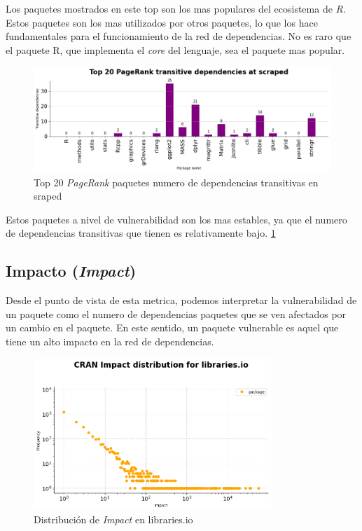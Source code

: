 Los paquetes mostrados en este top son los mas populares del ecosistema de \textit{R}.
Estos paquetes son los mas utilizados por otros paquetes, lo que los hace fundamentales para el
funcionamiento de la red de dependencias. No es raro que el paquete R, que implementa el \textit{core}
del lenguaje, sea el paquete mas popular.

\begin{figure}[h!]
    \begin{center}
        \includegraphics[width=1\textwidth]{img/cran/transitive_pr_scr.png}
        \caption{Top 20 \textit{PageRank} paquetes numero de dependencias transitivas en sraped}
        \label{fig:Top 20 PageRank paquetes numero de dependencias transitivas en sraped}
    \end{center}
\end{figure}

Estos paquetes a nivel de vulnerabilidad son los mas estables, ya que el numero de dependencias
transitivas que tienen es relativamente bajo. \ref{fig:Top 20 PageRank paquetes numero de dependencias transitivas en sraped}

\subsection{Impacto (\textit{Impact})}

Desde el punto de vista de esta metrica, podemos interpretar la vulnerabilidad de un paquete como el numero
de dependencias paquetes que se ven afectados por un cambio en el paquete. En este sentido, un paquete
vulnerable es aquel que tiene un alto impacto en la red de dependencias.

\begin{figure}[h!]
    \begin{center}
        \includegraphics[width=0.8\textwidth]{img/cran/impact_dist_libio.png}
        \caption{Distribución de \textit{Impact} en libraries.io}
        \label{fig:Distribución de Impact en libraries.io}
    \end{center}
\end{figure}

